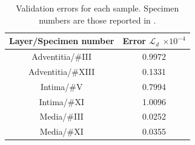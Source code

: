 \begin{table}[ht!]
\caption[Validation errors for each sample.]{Validation errors for each sample. Specimen numbers are those reported in \cite{holzapfel2005determination}.}
\label{tab:val-err}
\begin{center}
    \begin{tabular}{|c|c|} 
 \hline
 Layer/Specimen number & Error $\mathcal{L}_d$ $\times 10^{-4}$ \\
 \hline
 Adventitia/\#III & 0.9972 \\
 Adventitia/\#XIII & 0.1331 \\
 Intima/\#V & 0.7994 \\
 Intima/\#XI & 1.0096 \\
 Media/\#III & 0.0252 \\
 Media/\#XI & 0.0355 \\
 \hline
\end{tabular}
\end{center}

\end{table}
